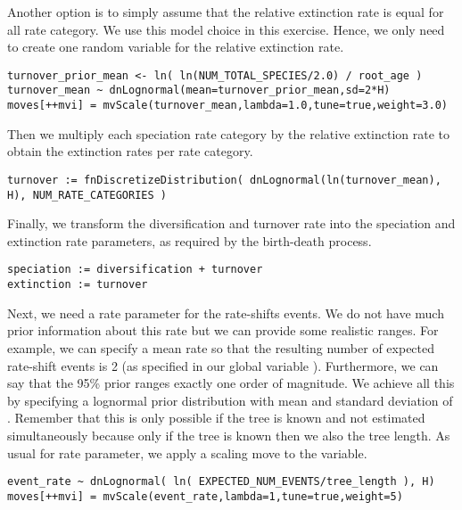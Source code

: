 Another option is to simply assume that the relative extinction rate is equal for all rate category.
We use this model choice in this exercise.
Hence, we only need to create one random variable for the relative extinction rate.
{\tt \begin{snugshade*}
\begin{lstlisting}
turnover_prior_mean <- ln( ln(NUM_TOTAL_SPECIES/2.0) / root_age )
turnover_mean ~ dnLognormal(mean=turnover_prior_mean,sd=2*H) 
moves[++mvi] = mvScale(turnover_mean,lambda=1.0,tune=true,weight=3.0)
\end{lstlisting}
\end{snugshade*}}
Then we multiply each speciation rate category by the relative extinction rate to obtain the extinction rates per rate category.
{\tt \begin{snugshade*}
\begin{lstlisting}
turnover := fnDiscretizeDistribution( dnLognormal(ln(turnover_mean), H), NUM_RATE_CATEGORIES )
\end{lstlisting}
\end{snugshade*}}
Finally, we transform the diversification and turnover rate into the speciation and extinction rate parameters, as required by the birth-death process.
{\tt \begin{snugshade*}
\begin{lstlisting}
speciation := diversification + turnover
extinction := turnover 
\end{lstlisting}
\end{snugshade*}}

Next, we need a rate parameter for the rate-shifts events.
We do not have much prior information about this rate but we can provide some realistic ranges.
For example, we can specify a mean rate so that the resulting number of expected rate-shift events is 2 (as specified in our global variable ).
Furthermore, we can say that the 95\% prior ranges exactly one order of magnitude.
We achieve all this by specifying a lognormal prior distribution with mean  and standard deviation of .
Remember that this is only possible if the tree is known and not estimated simultaneously because only if the tree is known then we also the tree length. 
As usual for rate parameter, we apply a scaling move to the  variable.
{\tt \begin{snugshade*}
\begin{lstlisting}
event_rate ~ dnLognormal( ln( EXPECTED_NUM_EVENTS/tree_length ), H)
moves[++mvi] = mvScale(event_rate,lambda=1,tune=true,weight=5)
\end{lstlisting}
\end{snugshade*}}

